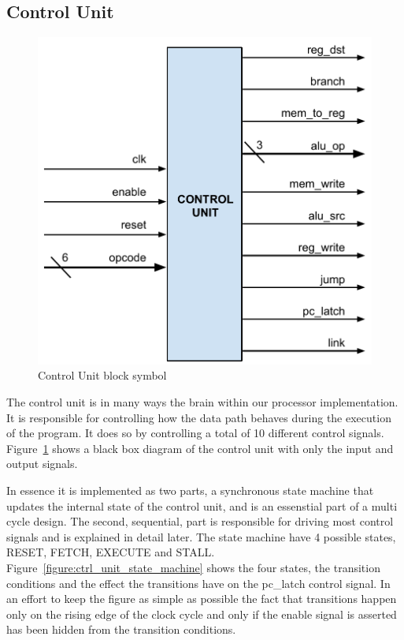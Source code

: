 \subsection{Control Unit}

\begin{figure}[h]
    \centering\includegraphics[scale=0.5]{figures/control_unit_block_symbol}
    \caption{Control Unit block symbol}
    \label{figure:ctrl_unit_block_symbol}    
\end{figure}
The control unit is in many ways the brain within our processor implementation. It is responsible for controlling how the data path behaves during the execution of the program. It does so by controlling a total of 10 different control signals. Figure~\ref{figure:ctrl_unit_block_symbol} shows a black box diagram of the control unit with only the input and output signals.

In essence it is implemented as two parts, a synchronous state machine that updates the internal state of the control unit, and is an essenstial part of a multi cycle design. The second, sequential, part is responsible for driving most control signals and is explained in detail later. The state machine have 4 possible states, RESET, FETCH, EXECUTE and STALL. Figure~\ref{figure:ctrl_unit_state_machine} shows the four states, the transition conditions and the effect the transitions have on the pc\_latch control signal. In an effort to keep the figure as simple as possible the fact that transitions happen only on the rising edge of the clock cycle and only if the enable signal is asserted has been hidden from the transition conditions.


